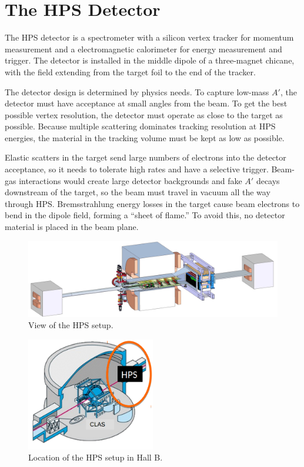 \chapter{The HPS Detector}

The HPS detector is a spectrometer with a silicon vertex tracker for momentum measurement and a electromagnetic calorimeter for energy measurement and trigger.
The detector is installed in the middle dipole of a three-magnet chicane, with the field extending from the target foil to the end of the tracker.

The detector design is determined by physics needs.
To capture low-mass $A'$, the detector must have acceptance at small angles from the beam.
To get the best possible vertex resolution, the detector must operate as close to the target as possible.
Because multiple scattering dominates tracking resolution at HPS energies, the material in the tracking volume must be kept as low as possible.

Elastic scatters in the target send large numbers of electrons into the detector acceptance, so it needs to tolerate high rates and have a selective trigger.
Beam-gas interactions would create large detector backgrounds and fake $A'$ decays downstream of the target, so the beam must travel in vacuum all the way through HPS.
Bremsstrahlung energy losses in the target cause beam electrons to bend in the dipole field, forming a ``sheet of flame.'' To avoid this, no detector material is placed in the beam plane.

\begin{figure}[ht]
    \includegraphics[width=\textwidth]{detector/figs/HPS-pic}
    \caption{View of the HPS setup.}
    \label{fig:hps-pic}
\end{figure}

\begin{figure}[ht]
    \begin{center}
        \includegraphics[width=0.5\textwidth]{detector/figs/hallb}
    \end{center}
    \caption{Location of the HPS setup in Hall B.}
    \label{fig:hallb}
\end{figure}

